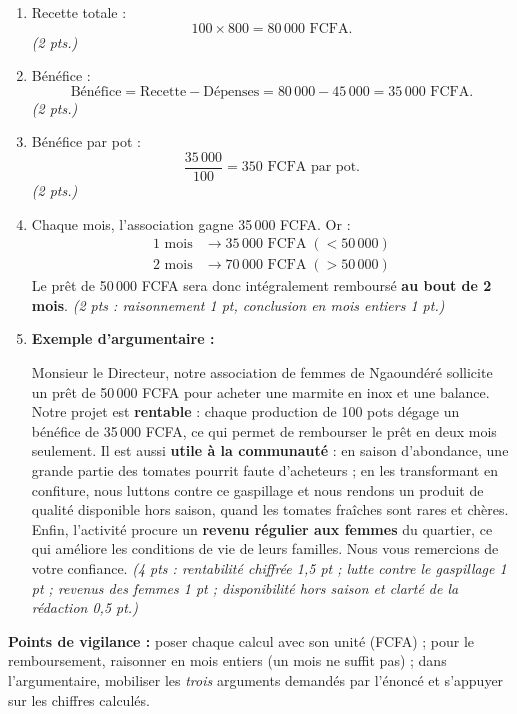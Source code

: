 \documentclass[11pt]{article}
\begin{document}
\begin{corrige}
\begin{enumerate}
\item Recette totale :
\[ 100 \times 800 = \boxed{80\,000 \text{ FCFA}}. \]
\emph{(2 pts.)}
\item Bénéfice :
\[ \text{Bénéfice} = \text{Recette} - \text{Dépenses} = 80\,000 - 45\,000 = \boxed{35\,000 \text{ FCFA}}. \]
\emph{(2 pts.)}
\item Bénéfice par pot :
\[ \frac{35\,000}{100} = \boxed{350 \text{ FCFA par pot}}. \]
\emph{(2 pts.)}
\item Chaque mois, l'association gagne 35\,000 FCFA. Or :
\begin{align*}
1 \text{ mois} &\rightarrow 35\,000 \text{ FCFA} \;(< 50\,000)\\
2 \text{ mois} &\rightarrow 70\,000 \text{ FCFA} \;(> 50\,000)
\end{align*}
Le prêt de 50\,000 FCFA sera donc intégralement remboursé \textbf{au bout de 2 mois}. \emph{(2 pts : raisonnement 1 pt, conclusion en mois entiers 1 pt.)}
\item \textbf{Exemple d'argumentaire :}

Monsieur le Directeur, notre association de femmes de Ngaoundéré sollicite un prêt de 50\,000 FCFA pour acheter une marmite en inox et une balance. Notre projet est \textbf{rentable} : chaque production de 100 pots dégage un bénéfice de 35\,000 FCFA, ce qui permet de rembourser le prêt en deux mois seulement. Il est aussi \textbf{utile à la communauté} : en saison d'abondance, une grande partie des tomates pourrit faute d'acheteurs ; en les transformant en confiture, nous luttons contre ce gaspillage et nous rendons un produit de qualité disponible hors saison, quand les tomates fraîches sont rares et chères. Enfin, l'activité procure un \textbf{revenu régulier aux femmes} du quartier, ce qui améliore les conditions de vie de leurs familles. Nous vous remercions de votre confiance. \emph{(4 pts : rentabilité chiffrée 1,5 pt ; lutte contre le gaspillage 1 pt ; revenus des femmes 1 pt ; disponibilité hors saison et clarté de la rédaction 0,5 pt.)}
\end{enumerate}
\textbf{Points de vigilance :} poser chaque calcul avec son unité (FCFA) ; pour le remboursement, raisonner en mois entiers (un mois ne suffit pas) ; dans l'argumentaire, mobiliser les \emph{trois} arguments demandés par l'énoncé et s'appuyer sur les chiffres calculés.
\end{corrige}
\end{document}
